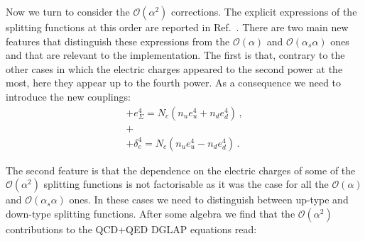 Now we turn to consider the $\mathcal{O}(\alpha^2)$ corrections. The
explicit expressions of the splitting functions at this order are
reported in Ref.~\cite{deFlorian:2016gvk}. There are two main new
features that distinguish these expressions from the
$\mathcal{O}(\alpha)$ and $\mathcal{O}(\alpha_s\alpha)$ ones and that
are relevant to the implementation. The first is that, contrary to the
other cases in which the electric charges appeared to the second power
at the most, here they appear up to the fourth power. As a consequence
we need to introduce the new couplings:
\begin{equation}
\begin{array}{l}
+e_{\Sigma}^4 = N_c(n_{u} e_u^4 + n_{d} e_d^4)\,,\\
+\\
+\delta_e^4 = N_c(n_{u} e_u^4 - n_{d} e_d^4)\,.
\end{array}
\end{equation}

The second feature is that the dependence on the electric charges of
some of the $\mathcal{O}(\alpha^2)$ splitting functions is not
factorisable as it was the case for all the $\mathcal{O}(\alpha)$ and
$\mathcal{O}(\alpha_s\alpha)$ ones. In these cases we need to
distinguish between up-type and down-type splitting functions. After
some algebra we find that the $\mathcal{O}(\alpha^2)$ contributions to
the QCD+QED DGLAP equations read:

